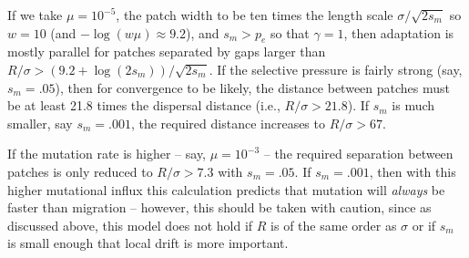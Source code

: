 \documentclass{article}
\newcommand{\linelabel}[1]{}
\newcommand{\migrate}{\lambda_\text{mig}}
\newcommand{\mutrate}{\lambda_\text{mut}}
\newcommand{\Tmig}{T_\text{mig}}
\newcommand{\Tmut}{T_\text{mut}}
\begin{document}

If we take 
$\mu=10^{-5}$,
the patch width to be ten times the length scale $\sigma/\sqrt{2s_m}$
so $w=10$ (and $-\log(w\mu)\approx 9.2$),
and $s_m>p_e$ so that $\gamma=1$,
then adaptation is mostly parallel for patches separated by gaps larger than $R/\sigma > (9.2+\log(2s_m))/\sqrt{2s_m}$.
If the selective pressure is fairly strong (say, $s_m=.05$),
then for convergence to be likely,
the distance between patches must be at least 21.8 times the dispersal distance (i.e., $R/\sigma > 21.8$).
If $s_m$ is much smaller, say $s_m = .001$, 
the required distance increases to $R/\sigma > 67$.

If the mutation rate is higher -- say, $\mu=10^{-3}$ --
the required separation between patches is only reduced to $R/\sigma > 7.3$ with $s_m=.05$.
If $s_m=.001$, then with this higher mutational influx this calculation predicts that mutation will \emph{always} be faster than migration
-- however, this should be taken with caution,
since as discussed above, this model does not hold if $R$ is of the same order as $\sigma$
or if $s_m$ is small enough that local drift is more important.
\linelabel{rr:separated_patches}

% 
\end{document}

